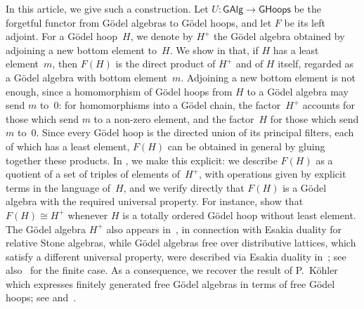 \documentclass[reqno,a4paper]{amsart}
\theoremstyle{plain}
\theoremstyle{definition}
\theoremstyle{remark}
\numberwithin{equation}{section}
\newcommand{\GHoops}{\ensuremath{\mathsf{GHoops}}}
\newcommand{\GAlg}{\ensuremath{\mathsf{GAlg}}}
\begin{document}
In this article, we give such a construction. Let $U\colon\GAlg\to\GHoops$ be the forgetful functor from G\"odel algebras to G\"odel hoops, and let $F$ be its left adjoint. For a G\"odel hoop~$H$, we denote by $H^+$ the G\"odel algebra obtained by adjoining a new bottom element to~$H$. We show in  that, if $H$ has a least element~$m$, then $F(H)$ is the direct product of $H^+$ and of $H$ itself, regarded as a G\"odel algebra with bottom element~$m$. Adjoining a new bottom element is not enough, since a homomorphism of G\"odel hoops from $H$ to a G\"odel algebra may send $m$ to~$0$: for homomorphisms into a G\"odel chain, the factor~$H^+$ accounts for those which send $m$ to a non-zero element, and the factor~$H$ for those which send $m$ to~$0$. Since every G\"odel hoop is the directed union of its principal filters, each of which has a least element, $F(H)$ can be obtained in general by gluing together these products. In , we make this explicit: we describe $F(H)$ as a quotient of a set of triples of elements of~$H^+$, with operations given by explicit terms in the language of~$H$, and we verify directly that $F(H)$ is a G\"odel algebra with the required universal property. For instance,  show that $F(H)\cong H^+$ whenever $H$ is a totally ordered G\"odel hoop without least element. The G\"odel algebra $H^+$ also appears in~\cite[Section~3.1]{FG}, in connection with Esakia duality for relative Stone algebras, while G\"odel algebras free over distributive lattices, which satisfy a different universal property, were described via Esakia duality in~\cite[Theorem~3.19]{Carai}; see also~\cite{AGM} for the finite case. As a consequence, we recover the result of P.~K\"ohler which expresses finitely generated free G\"odel algebras in terms of free G\"odel hoops; see  and~\cite[Theorem~5.7]{Davey}.
\end{document}
